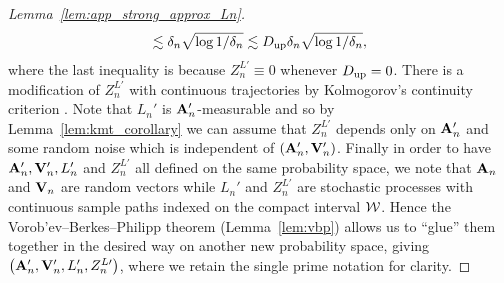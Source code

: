 \begin{proof}[Lemma~\ref{lem:app_strong_approx_Ln}]
\begin{align*}
    \lesssim
    \delta_n \sqrt{\log 1/\delta_n}
    \lesssim
    D_{\textup{up}}
    \delta_n \sqrt{\log 1/\delta_n},
  \end{align*}
  where the last inequality is because
  $Z_n^{L\prime} \equiv 0$ whenever $D_{\textup{up}} = 0$.
  There is a modification of $Z_n^{L\prime}$
  with continuous trajectories
  by Kolmogorov's continuity criterion
  \citep[Theorem~2.9]{legall2016brownian}.
  Note that $L_n'$ is $\mathbf{A}_n'$-measurable
  and so by Lemma~\ref{lem:kmt_corollary}
  we can assume that $Z_n^{L\prime}$
  depends only on $\mathbf{A}_n'$ and some
  random noise which is independent of
  $(\mathbf{A}_n', \mathbf{V}_n')$.
  Finally in order to have
  $\mathbf{A}_n', \mathbf{V}_n', L_n'$ and $Z_n^{L\prime}$
  all defined on the same probability space,
  we note that $\mathbf{A}_n$ and $\mathbf{V}_n$ are random vectors
  while $L_n'$ and $Z_n^{L\prime}$
  are stochastic processes
  with continuous sample paths
  indexed on
  the compact interval $\mathcal{W}$.
  Hence the Vorob'ev--Berkes--Philipp theorem
  (Lemma~\ref{lem:vbp})
  allows us to ``glue'' them together
  in the desired way
  on another new probability space,
  giving
  $\big(\mathbf{A}_n', \mathbf{V}_n', L_n', Z_n^{L\prime}\big)$,
  where we retain the single prime notation for clarity.
\end{proof}

